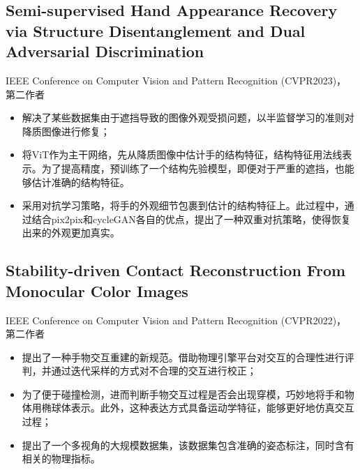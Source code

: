 \documentclass{resume}
\begin{document}
\subsection{\textbf{Semi-supervised Hand Appearance Recovery via Structure Disentanglement and Dual Adversarial Discrimination}}
IEEE Conference on Computer Vision and Pattern Recognition (CVPR2023)， 第二作者
\begin{itemize}
  \item 解决了某些数据集由于遮挡导致的图像外观受损问题，以半监督学习的准则对降质图像进行修复；
  \item 将ViT作为主干网络，先从降质图像中估计手的结构特征，结构特征用法线表示。为了提高精度，预训练了一个结构先验模型，即便对于严重的遮挡，也能够估计准确的结构特征。
  \item 采用对抗学习策略，将手的外观细节包裹到估计的结构特征上。此过程中，通过结合pix2pix和cycleGAN各自的优点，提出了一种双重对抗策略，使得恢复出来的外观更加真实。
\end{itemize}

\subsection{\textbf{Stability-driven Contact Reconstruction From Monocular Color Images}}
IEEE Conference on Computer Vision and Pattern Recognition (CVPR2022)， 第二作者
\begin{itemize}
  \item 提出了一种手物交互重建的新规范。借助物理引擎平台对交互的合理性进行评判，并通过迭代采样的方式对不合理的交互进行校正；
  \item 为了便于碰撞检测，进而判断手物交互过程是否会出现穿模，巧妙地将手和物体用椭球体表示。此外，这种表达方式具备运动学特征，能够更好地仿真交互过程；
  \item 提出了一个多视角的大规模数据集，该数据集包含准确的姿态标注，同时含有相关的物理指标。
\end{itemize}


\end{document}
